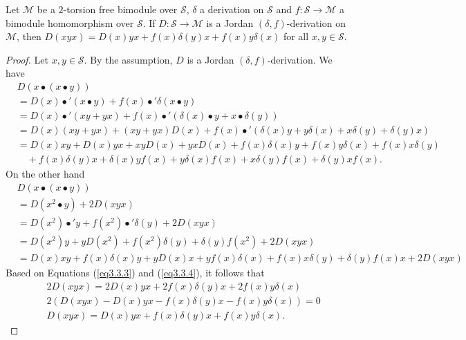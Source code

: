 \documentclass{arxiv}
\begin{document}
\begin{lemma}\label{Lemma3.3.3}
    Let $\mathcal{M}$ be a $2$-torsion free bimodule over $\mathcal{S}$, $\delta$ a derivation on $\mathcal{S}$ and $f : \mathcal{S} \rightarrow \mathcal{M}$ a bimodule homomorphism over $\mathcal{S}$. If $D: \mathcal{S} \rightarrow \mathcal{M}$ is a Jordan $(\delta,f)$-derivation on $\mathcal{M}$, then $D(xyx)= D(x)yx + f(x)\delta (y)x + f(x)y\delta(x)$ for all $x,y \in \mathcal{S}$.
\end{lemma}
\begin{proof}
    Let $x,y \in \mathcal{S}$. By the assumption, $D$ is a Jordan $(\delta,f)$-derivation. We have
    \begin{align}
        &D(x \bullet ( x \bullet y)) \nonumber \\
        &= D(x)\bullet' (x \bullet y) + f(x) \bullet' \delta (x \bullet y)\nonumber \\
        &= D(x) \bullet' (xy+yx) + f(x) \bullet' (\delta (x) \bullet y+ x \bullet \delta(y)) \nonumber \\
        &= D(x) (xy+yx) + (xy+yx) D(x) + f(x) \bullet' (\delta(x)y+y\delta(x)+x\delta(y)+\delta(y)x)\nonumber \\
        &= D(x)xy+D(x)yx +xyD(x) + yxD(x) + f(x)\delta(x)y+f(x)y\delta(x)+f(x)x\delta(y)\nonumber\\
        &\quad +f(x)\delta(y)x+\delta(x)yf(x)+y\delta(x)f(x)+x\delta(y)f(x)+\delta(y)xf(x).\label{eq3.3.3}
    \end{align}
    On the other hand
    \begin{align}
        &D(x \bullet ( x \bullet y)) \nonumber \\
        &= D(x^2 \bullet y) +2D(xyx) \nonumber \\
        &= D(x^2) \bullet' y + f(x^2) \bullet' \delta(y) + 2D(xyx)\nonumber \\
        &= D(x^2) y + yD(x^2) + f(x^2) \delta (y) + \delta (y) f(x^2) + 2D(xyx) \nonumber \\
        &= D(x)xy+f(x)\delta(x)y + yD(x)x+yf(x)\delta(x) + f(x)x\delta(y) + \delta(y)f(x)x+2D(xyx)\label{eq3.3.4}
    \end{align}
    Based on Equations (\ref{eq3.3.3}) and (\ref{eq3.3.4}), it follows that 
    \begin{align*}
        &2D(xyx) = 2D(x)yx+2f(x)\delta (y) x+ 2 f(x)y\delta (x)\\
        &2(D(xyx)-D(x)yx-f(x)\delta (y)x- f(x)y\delta (x)) = 0\\
        &D(xyx) = D(x)yx + f(x)\delta (y)x + f(x)y\delta (x).
    \end{align*}
\end{proof}
\end{document}
